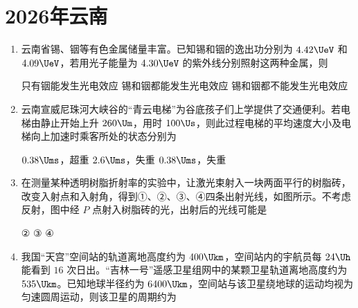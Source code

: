\chapter{2026年云南}
\begin{enumerate}
\item
云南省锡、铟等有色金属储量丰富。已知锡和铟的逸出功分别为 $ 4.42 \UeV $ 和 $ 4.09 \UeV $，若用光子能量为 $ 4.30 \UeV $ 的紫外线分别照射这两种金属，则 


{只有铟能发生光电效应}
{锡和铟都能发生光电效应}
{锡和铟都不能发生光电效应}


\item
云南宣威尼珠河大峡谷的“青云电梯”为谷底孩子们上学提供了交通便利。若电梯由静止开始上升 $ 260 \Um $，用时 $ 100 \Us $，则此过程电梯的平均速度大小及电梯向上加速时乘客所处的状态分别为 


{$ 0.38 \Ums $，超重}
{$ 2.6 \Ums $，失重}
{$ 0.38 \Ums $，失重}


\item
在测量某种透明树脂折射率的实验中，让激光束射入一块两面平行的树脂砖，改变入射点和入射角，得到①、②、③、④四条出射光线，如图所示。不考虑反射，图中经 $ P $ 点射入树脂砖的光，出射后的光线可能是 
\begin{figure}[htbp]
	\centering
	
\end{figure}

{②}
{③}
{④}


\item
我国“天宫”空间站的轨道离地高度约为 $ 400 \Ukm $，空间站内的宇航员每 $ 24 \Uh $ 能看到 $ 16 $ 次日出。“吉林一号”遥感卫星组网中的某颗卫星轨道离地高度约为 $ 535 \Ukm $。已知地球半径约为 $ 6400 \Ukm $，空间站与该卫星绕地球的运动均视为匀速圆周运动，则该卫星的周期约为 



\end{enumerate}
